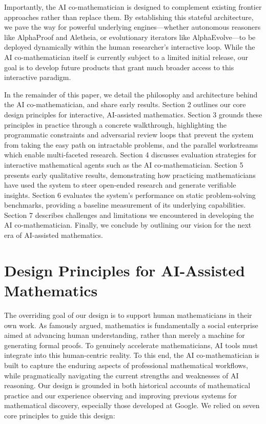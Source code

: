 \documentclass[11pt, a4paper, copyright, gdm]{google}
\begin{document}
Importantly, the AI co-mathematician is designed to complement existing frontier approaches rather than replace them.
By establishing this stateful architecture, we pave the way for powerful underlying engines---whether autonomous reasoners like AlphaProof and Aletheia, or evolutionary iterators like AlphaEvolve---to be deployed dynamically within the human researcher's interactive loop.
While the AI co-mathematician itself is currently subject to a limited initial release, our goal is to develop future products that grant much broader access to this interactive paradigm.

In the remainder of this paper, we detail the philosophy and architecture behind the AI co-mathematician, and share early results.
Section 2 outlines our core design principles for interactive, AI-assisted mathematics.
Section 3 grounds these principles in practice through a concrete walkthrough, highlighting the programmatic constraints and adversarial review loops that prevent the system from taking the easy path on intractable problems, and the parallel workstreams which enable multi-faceted research.
Section 4 discusses evaluation strategies for interactive mathematical agents such as the AI co-mathematician.
Section 5 presents early qualitative results, demonstrating how practicing mathematicians have used the system to steer open-ended research and generate verifiable insights.
Section 6 evaluates the system's performance on static problem-solving benchmarks, providing a baseline measurement of its underlying capabilities.
Section 7 describes challenges and limitations we encountered in developing the AI co-mathematician.
Finally, we conclude by outlining our vision for the next era of AI-assisted mathematics. 


\section{Design Principles for AI-Assisted Mathematics}

The overriding goal of our design is to support human mathematicians in their own work.
As \citet{Thurston1994} famously argued, mathematics is fundamentally a social enterprise aimed at advancing human understanding, rather than merely a machine for generating formal proofs.
To genuinely accelerate mathematicians, AI tools must integrate into this human-centric reality.
To this end, the AI co-mathematician is built to capture the enduring aspects of professional mathematical workflows, while pragmatically navigating the current strengths and weaknesses of AI reasoning.
Our design is grounded in both historical accounts of mathematical practice and our experience observing and improving previous systems for mathematical discovery, especially those developed at Google.
We relied on seven core principles to guide this design:
\end{document}
